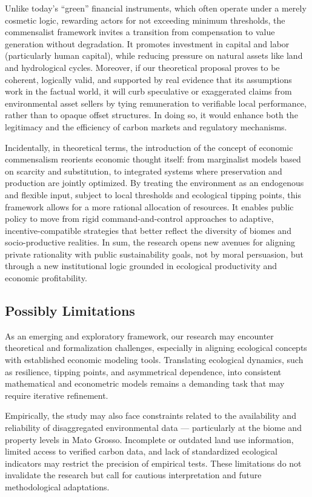 Unlike today’s “green” financial instruments, which often operate under a merely cosmetic logic, rewarding actors for not exceeding minimum thresholds, the commensalist framework invites a transition from compensation to value generation without degradation. It promotes investment in capital and labor (particularly human capital), while reducing pressure on natural assets like land and hydrological cycles. Moreover, if our theoretical proposal proves to be coherent, logically valid, and supported by real evidence that its assumptions work in the factual world, it will curb speculative or exaggerated claims from environmental asset sellers by tying remuneration to verifiable local performance, rather than to opaque offset structures. In doing so, it would enhance both the legitimacy and the efficiency of carbon markets and regulatory mechanisms.

Incidentally, in theoretical terms, the introduction of the concept of economic commensalism reorients economic thought itself: from marginalist models based on scarcity and substitution, to integrated systems where preservation and production are jointly optimized. By treating the environment as an endogenous and flexible input, subject to local thresholds and ecological tipping points, this framework allows for a more rational allocation of resources. It enables public policy to move from rigid command-and-control approaches to adaptive, incentive-compatible strategies that better reflect the diversity of biomes and socio-productive realities. In sum, the research opens new avenues for aligning private rationality with public sustainability goals, not by moral persuasion, but through a new institutional logic grounded in ecological productivity and economic profitability.

\subsection{Possibly Limitations}

As an emerging and exploratory framework, our research may encounter theoretical and formalization challenges, especially in aligning ecological concepts with established economic modeling tools. Translating ecological dynamics, such as resilience, tipping points, and asymmetrical dependence, into consistent mathematical and econometric models remains a demanding task that may require iterative refinement.

Empirically, the study may also face constraints related to the availability and reliability of disaggregated environmental data — particularly at the biome and property levels in Mato Grosso. Incomplete or outdated land use information, limited access to verified carbon data, and lack of standardized ecological indicators may restrict the precision of empirical tests. These limitations do not invalidate the research but call for cautious interpretation and future methodological adaptations.

\newpage

